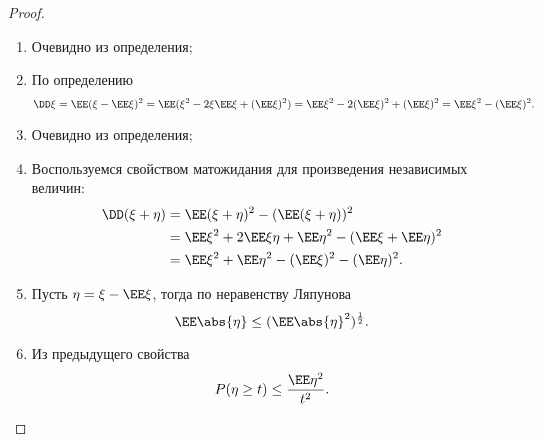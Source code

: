 \begin{proof}
\begin{enumerate}
    \item Очевидно из определения;
    \item По определению
    $$\DD \xi = \EE (\xi - \EE \xi)^2 = \EE (\xi^2 - 2\xi \EE \xi + (\EE \xi)^2) = \EE \xi^2 - 2(\EE \xi)^2 + (\EE \xi)^2 = \EE \xi^2 - (\EE \xi)^2.$$

    \item      Очевидно из определения;            
             

    \item Воспользуемся свойством матожидания для произведения независимых величин:
    \begin{align*}
        \DD (\xi+\eta) &= \EE (\xi +\eta)^2 - (\EE (\xi +\eta))^2 \\&= \EE \xi^2 + 2\EE \xi\eta + \EE \eta^2 - (\EE \xi + \EE \eta)^2 \\&= \EE \xi^2 + \EE \eta^2 - (\EE \xi)^2 - (\EE \eta)^2.
    \end{align*}
                   
            
               
    
            
        \item Пусть $\eta =\xi - \EE \xi$, тогда по неравенству Ляпунова
        $$\EE \abs{\eta} \le (\EE \abs{\eta}^2)^\frac{1}{2}.$$
              
              
        \item Из предыдущего свойства
               	 $$P(\eta\ge t) \le \frac{\EE \eta^2}{t^2}.$$ \qedhere
               	 \end{enumerate}
               \end{proof}
